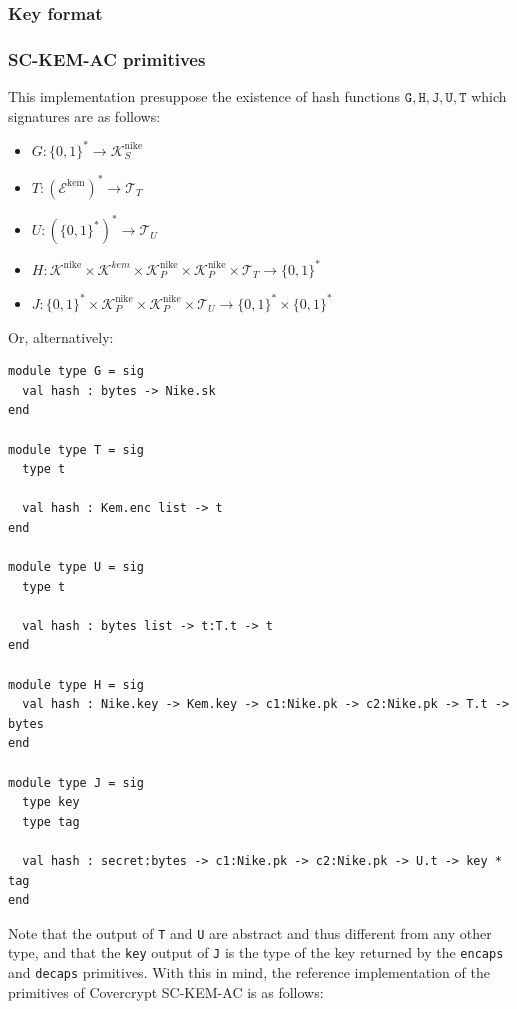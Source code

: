 \documentclass[a4paper]{article}
\theoremstyle{definition}
\newcommand{\cE}{\mathcal{E}}
\newcommand{\cK}{\mathcal{K}}
\newcommand{\cT}{\mathcal{T}}
\begin{document}
\subsubsection{Key format}
\label{sec:orge305681}

\subsubsection{SC-KEM-AC primitives}
\label{sec:orgac8ae39}

This implementation presuppose the existence of hash functions \(\mathtt{G, H, J,
U, T}\) which signatures are as follows:
\begin{itemize}
\item \(G : \{0,1\}^* \rightarrow \cK_S^\mathrm{nike}\)
\item \(T : (\cE^\mathrm{kem})^* \rightarrow \cT_T\)
\item \(U : (\{0,1\}^*)^* \rightarrow \cT_U\)
\item \(H : \cK^\mathrm{nike} \times \cK^{kem} \times \cK_P^\mathrm{nike} \times
  \cK_P^\mathrm{nike} \times \cT_T \rightarrow \{0,1\}^*\)
\item \(J : \{0,1\}^* \times \cK_P^\mathrm{nike} \times \cK_P^\mathrm{nike} \times
  \cT_U \rightarrow \{0,1\}^* \times \{0,1\}^*\)
\end{itemize}
Or, alternatively:
\begin{verbatim}
module type G = sig
  val hash : bytes -> Nike.sk
end

module type T = sig
  type t

  val hash : Kem.enc list -> t
end

module type U = sig
  type t

  val hash : bytes list -> t:T.t -> t
end

module type H = sig
  val hash : Nike.key -> Kem.key -> c1:Nike.pk -> c2:Nike.pk -> T.t -> bytes
end

module type J = sig
  type key
  type tag

  val hash : secret:bytes -> c1:Nike.pk -> c2:Nike.pk -> U.t -> key * tag
end
\end{verbatim}
Note that  the output of \texttt{T}  and \texttt{U} are  abstract and thus different  from any
other type, and that the \texttt{key} output of  \texttt{J} is the type of the key returned by
the  \texttt{encaps}  and  \texttt{decaps}  primitives.   With this  in  mind,  the  reference
implementation of the primitives of Covercrypt SC-KEM-AC is as follows:
\end{document}

